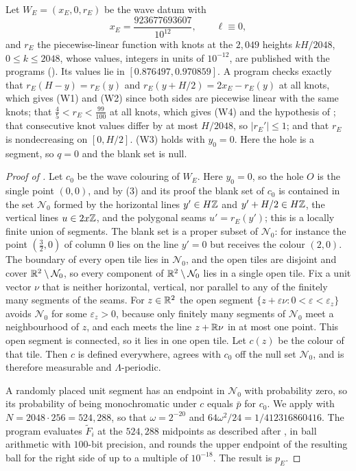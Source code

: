 \documentclass[11pt,colorlinks]{charlie}
\begin{document}
Let $W_E=(x_E,0,r_E)$ be the wave datum with
\[
 x_E=\frac{923677693607}{10^{12}},\qquad \ell\equiv0,
\]
and $r_E$ the piecewise-linear function with knots at the $2{,}049$ heights $kH/2048$, $0\le k\le2048$, whose values, integers in units of $10^{-12}$, are published with the programs (). Its values lie in $[0.876497,0.970859]$. A program checks exactly that $r_E(H-y)=r_E(y)$ and $r_E(y+H/2)=2x_E-r_E(y)$ at all knots, which gives (W1) and (W2) since both sides are piecewise linear with the same knots; that $\tfrac45<r_E<\tfrac{99}{100}$ at all knots, which gives (W4) and the hypothesis of ; that consecutive knot values differ by at most $H/2048$, so $|r_E'|\le1$; and that $r_E$ is nondecreasing on $[0,H/2]$. (W3) holds with $y_0=0$. Here the hole is a segment, so $q=0$ and the blank set is null.

\begin{proof}[Proof of ]
Let $c_0$ be the wave colouring of $W_E$. Here $y_0=0$, so the hole $O$ is the single point $(0,0)$, and by (3) and its proof the blank set of $c_0$ is contained in the set $\mathcal N_0$ formed by the horizontal lines $y'\in H\mathbb{Z}$ and $y'+H/2\in H\mathbb{Z}$, the vertical lines $u\in2x\mathbb{Z}$, and the polygonal seams $u'=r_E(y')$; this is a locally finite union of segments. The blank set is a proper subset of $\mathcal N_0$: for instance the point $(\tfrac32,0)$ of column $0$ lies on the line $y'=0$ but receives the colour $(2,0)$. The boundary of every open tile lies in $\mathcal N_0$, and the open tiles are disjoint and cover $\mathbb{R}^2\setminus\mathcal N_0$, so every component of $\mathbb{R}^2\setminus\mathcal N_0$ lies in a single open tile. Fix a unit vector $\nu$ that is neither horizontal, vertical, nor parallel to any of the finitely many segments of the seams. For $z\in\mathbb{R}^2$ the open segment $\{z+\varepsilon \nu:0<\varepsilon<\varepsilon_z\}$ avoids $\mathcal N_0$ for some $\varepsilon_z>0$, because only finitely many segments of $\mathcal N_0$ meet a neighbourhood of $z$, and each meets the line $z+\mathbb{R} \nu$ in at most one point. This open segment is connected, so it lies in one open tile. Let $c(z)$ be the colour of that tile. Then $c$ is defined everywhere, agrees with $c_0$ off the null set $\mathcal N_0$, and is therefore measurable and $\Lambda$-periodic.

A randomly placed unit segment has an endpoint in $\mathcal N_0$ with probability zero, so its probability of being monochromatic under $c$ equals $\bar p$ for $c_0$. We apply  with $N=2048\cdot256=524{,}288$, so that $\omega=2^{-20}$ and $64\omega^2/24=1/412316860416$. The program evaluates $\tilde F_i$ at the $524{,}288$ midpoints as described after , in ball arithmetic with $100$-bit precision, and rounds the upper endpoint of the resulting ball for the right side of  up to a multiple of $10^{-18}$. The result is $p_E$.
\end{proof}
\end{document}
